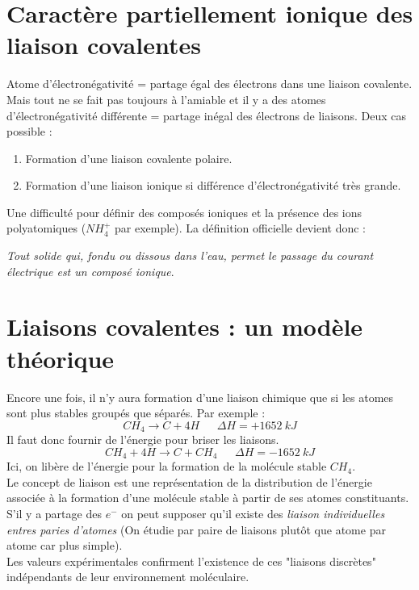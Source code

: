 \documentclass	[11pt, a4paper, openany]{book}
\begin{document}
\section{Caractère partiellement ionique des liaison covalentes}
Atome d'électronégativité = partage égal des électrons dans une liaison covalente. Mais tout ne se fait pas toujours à l'amiable et il y a des atomes d'électronégativité différente = partage inégal des électrons de liaisons. Deux cas possible : 
\begin{enumerate}
	\item Formation d'une liaison covalente polaire.
	\item Formation d'une liaison ionique si différence d'électronégativité très grande.
\end{enumerate}
Une difficulté pour définir des composés ioniques et la présence des ions polyatomiques ($NH_4^+$ par exemple). La définition officielle devient donc : 
\begin{center}
	\textit{Tout solide qui, fondu ou dissous dans l'eau, permet le passage du courant électrique est un composé ionique}.
\end{center}

\section{Liaisons covalentes : un modèle théorique}
Encore une fois, il n'y aura formation d'une liaison chimique que si les atomes sont plus stables groupés que séparés. Par exemple : 
$$CH_4 \rightarrow C + 4H\ \ \ \ \ \ \ \Delta H = + 1652\ kJ$$
Il faut donc fournir de l'énergie pour briser les liaisons.
$$CH_4 + 4H \rightarrow C + CH_4\ \ \ \ \ \ \ \Delta H = - 1652\ kJ$$
Ici, on libère de l'énergie pour la formation de la molécule stable $CH_4$.\\

Le concept de liaison est une représentation de la distribution de l'énergie associée à la formation d'une molécule stable à partir de ses atomes constituants.\\
S'il y a partage des $e^-$ on peut supposer qu'il existe des \textit{liaison individuelles entres paries d'atomes} (On étudie par paire de liaisons plutôt que atome par atome car plus simple).\\

Les valeurs expérimentales confirment l'existence de ces "liaisons discrètes" indépendants de leur environnement moléculaire.
\end{document}
